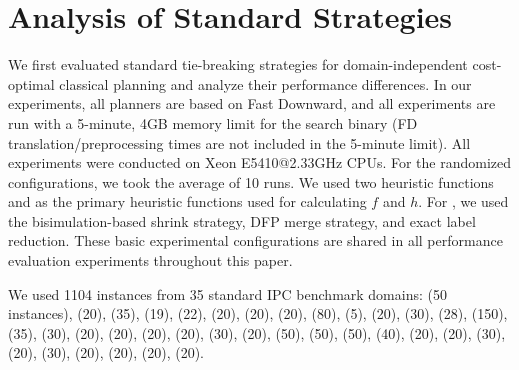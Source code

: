 \section{Analysis of Standard Strategies}
\label{sec:eval-common-strategies}

We first evaluated standard tie-breaking strategies for domain-independent cost-optimal
classical planning and analyze their performance differences.  
In our experiments, all planners are based on Fast
Downward, and all experiments are run with a 5-minute,
4GB memory limit for the search binary (FD translation/preprocessing
times are not included in the 5-minute limit).  All experiments were
conducted on Xeon E5410@2.33GHz CPUs. For the randomized configurations, we took the average of 10 runs.
% 
We used two \sota heuristic functions \lmcut \cite{Helmert2009} and \mands \cite{HelmertHHN14} as the primary
heuristic functions used for calculating $f$ and $h$.  For \mands, we used the bisimulation-based shrink strategy, DFP merge strategy, and exact label reduction.
These basic experimental
configurations are shared in all performance evaluation experiments throughout this paper. 

We used 1104 instances from 35 standard IPC benchmark domains:
 (50 instances),
(20), (35), (19), (22), (20),
(20), (20), (80), (5),
(20), (30), (28), (150), (35),
(30), (20), (20),
(20), (20), (30),
(20), (50), (50),
(50), (40), (20), (20),
(30), (20), (30), (20),
(20), (20), (20).

